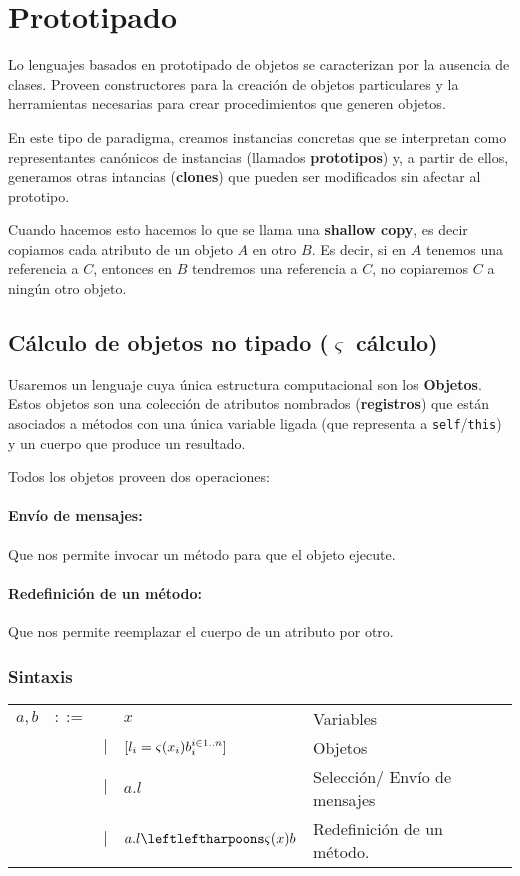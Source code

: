 
\section{Prototipado}
Lo lenguajes basados en prototipado de objetos se caracterizan por la ausencia de clases. Proveen constructores para la creación de objetos particulares y la herramientas necesarias para crear procedimientos que generen objetos.

En este tipo de paradigma, creamos instancias concretas que se interpretan como representantes canónicos de instancias (llamados \textbf{prototipos}) y, a partir de ellos, generamos otras intancias (\textbf{clones}) que pueden ser modificados sin afectar al prototipo.

Cuando hacemos esto hacemos lo que se llama una \textbf{shallow copy}, es decir copiamos cada atributo de un objeto $A$ en otro $B$. Es decir, si en $A$ tenemos una referencia a $C$, entonces en $B$ tendremos una referencia a $C$, no copiaremos $C$ a ningún otro objeto.

\subsection{Cálculo de objetos no tipado \texorpdfstring{($\varsigma$ cálculo)}{}}
Usaremos un lenguaje cuya única estructura computacional son los \textbf{Objetos}. Estos objetos son una colección de atributos nombrados (\textbf{registros}) que están asociados a métodos con una única variable ligada (que representa a \texttt{self}/\texttt{this}) y un cuerpo que produce un resultado.

Todos los objetos proveen dos operaciones:

\paragraph{Envío de mensajes:} Que nos permite invocar un método para que el objeto ejecute.

\paragraph{Redefinición de un método:} Que nos permite reemplazar el cuerpo de un atributo por otro.

\subsubsection{Sintaxis}
\begin{tabular}{lllll}
	$a,b$ &$::=$& &$x$ & Variables \\
 	      &     & $|$ &$[l_i = \varsigma(x_i)b_i^{i\in1..n}]$ &  Objetos\\
 	      &     & $|$ &$a.l$ &  Selección/ Envío de mensajes \\
 	      &     & $|$ &$\OORedefinicion{a.l}{x}{b}$ &  Redefinición de un método.	       	       	      
\end{tabular}

